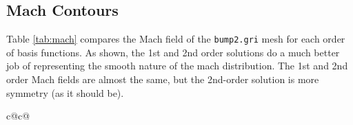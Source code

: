 \documentclass{article}
\begin{document}
\subsection{Mach Contours}
Table \ref{tab:mach} compares the Mach field of the \texttt{bump2.gri} mesh for each order of basis functions.
As shown, the 1st and 2nd order solutions do a much better job of representing the smooth nature of the mach distribution.
The 1st and 2nd order Mach fields are almost the same, but the 2nd-order solution is more symmetry (as it should be).
\begin{table}[H]
	\begin{center}
	\begin{tabular}{ c@{}c@{} }


		\hline
		\\


		\hline
		\\

		\hline
		\\
		\hline

		\\
		\hline
		\\
		\hline

		\\
	\end{tabular}
	\caption{\texttt{bump2.gri} Mach contours for each method}
	\label{tab:mach}
	\vspace*{-3mm}
	\end{center}
\end{table}
\end{document}
